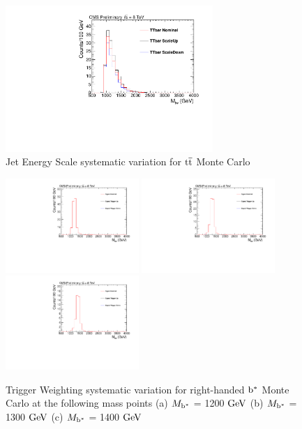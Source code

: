 \begin{figure}[htcb]
\begin{center}
\includegraphics[width=0.7\textwidth]{AN-14-049/figs/TTbar_PtScaling}
\caption{Jet Energy Scale systematic variation for $\mathrm{t\overline{t}}$ Monte Carlo}
\label{figs:bsttbarJES}
\end{center}
\end{figure}

\begin{figure}[htcb]
\begin{center}
\includegraphics[width=0.45\textwidth]{AN-14-049/figs/Signal_M1200_TriggerWeighting}
\includegraphics[width=0.45\textwidth]{AN-14-049/figs/Signal_M1300_TriggerWeighting}
\includegraphics[width=0.45\textwidth]{AN-14-049/figs/Signal_M1400_TriggerWeighting}
\caption{
Trigger Weighting systematic variation for right-handed $\mathrm{b}^{*}$  Monte Carlo at the following mass points
(a) $M_{\mathrm{b}^{*}}$ = 1200$~\mathrm{GeV}$ 
(b) $M_{\mathrm{b}^{*}}$ = 1300$~\mathrm{GeV}$
(c) $M_{\mathrm{b}^{*}}$ = 1400$~\mathrm{GeV}$ 
}
\label{figs:bssignaltrig}
\end{center}
\end{figure}

